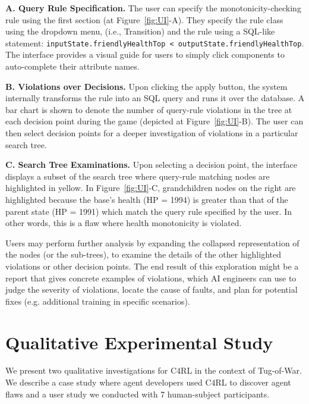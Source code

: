 \documentclass[letterpaper]{article} %
\begin{document}
\textbf{A. Query Rule Specification.}
The user can specify the monotonicity-checking rule using the first section (at Figure~\ref{fig:UI}-A). 
They specify the rule class using the dropdown menu, (i.e., Transition)
and the rule using a SQL-like statement: 
{\small \texttt{inputState.friendlyHealthTop < outputState.friendlyHealthTop}}.
The interface provides a visual guide for users to simply click components to auto-complete their attribute names.

\textbf{B. Violations over Decisions.}
Upon clicking the apply button, the system internally transforms the rule into an SQL query and runs it over the database.
A bar chart is shown to denote the number of query-rule violations in the tree at each decision point during the game
(depicted at Figure~\ref{fig:UI}-B). 
The user can then select decision points for a deeper investigation of violations in a particular search tree. %

\textbf{C. Search Tree Examinations.}
Upon selecting a decision point,
the interface displays a subset of the search tree where query-rule matching nodes are highlighted in yellow. In Figure~\ref{fig:UI}-C, grandchildren nodes on the right are highlighted because the base's health (HP = 1994) is greater than that of the parent state (HP = 1991) which match the query rule specified by the user. In other words, this is a flaw where health monotonicity is violated.

Users may perform further analysis by expanding the collapsed representation of the nodes (or the sub-trees), to examine the details of the other highlighted violations or other decision points.
The end result of this exploration might be a report that gives concrete examples of violations, which AI engineers can use to judge the severity of violations, locate the cause of faults, and plan for potential fixes (e.g. additional training in specific scenarios)\cite{DBLP:journals/corr/abs-1809-07424, khanna2022finding}. 

\section{Qualitative Experimental Study}
\label{sec:eval}

We present two qualitative investigations for C4RL in the context of Tug-of-War. We describe a case study where agent developers used C4RL to discover agent flaws and
a user study we conducted with 7 human-subject participants.
\end{document}
